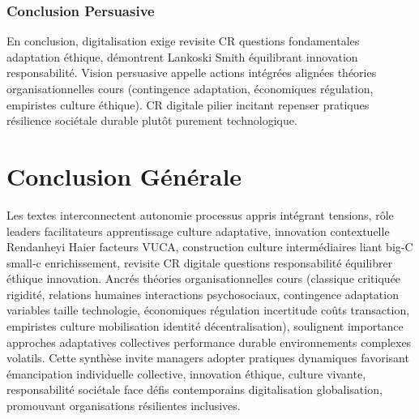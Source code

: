 \documentclass[11pt]{rapportECL}
\begin{document}
\subsubsection{Conclusion Persuasive}
En conclusion, digitalisation exige revisite CR questions fondamentales adaptation éthique, démontrent Lankoski Smith équilibrant innovation responsabilité. Vision persuasive appelle actions intégrées alignées théories organisationnelles cours (contingence adaptation, économiques régulation, empiristes culture éthique). CR digitale pilier incitant repenser pratiques résilience sociétale durable plutôt purement technologique.

\section{Conclusion Générale}
Les textes interconnectent autonomie processus appris intégrant tensions, rôle leaders facilitateurs apprentissage culture adaptative, innovation contextuelle Rendanheyi Haier facteurs VUCA, construction culture intermédiaires liant big-C small-c enrichissement, revisite CR digitale questions responsabilité équilibrer éthique innovation. Ancrés théories organisationnelles cours (classique critiquée rigidité, relations humaines interactions psychosociaux, contingence adaptation variables taille technologie, économiques régulation incertitude coûts transaction, empiristes culture mobilisation identité décentralisation), soulignent importance approches adaptatives collectives performance durable environnements complexes volatils. Cette synthèse invite managers adopter pratiques dynamiques favorisant émancipation individuelle collective, innovation éthique, culture vivante, responsabilité sociétale face défis contemporains digitalisation globalisation, promouvant organisations résilientes inclusives.

\end{document}
